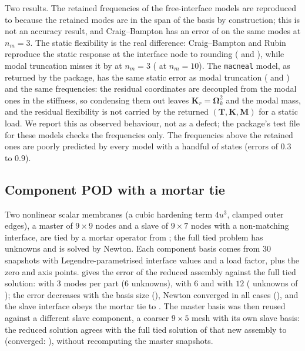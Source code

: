 Two results. The retained frequencies of the free-interface models are reproduced to \ccmFreeRubinLow{} because the retained modes are in the span of the basis by construction; this is not an accuracy result, and Craig--Bampton has an error of \ccmFreeCbLowThree{} on the same modes at $n_m=3$. The static flexibility is the real difference: Craig--Bampton and Rubin reproduce the static response at the interface node to rounding (\ccmFreeCbStatic{} and \ccmFreeRubinStatic{}), while modal truncation misses it by \ccmFreeModalStatic{} at $n_m=3$ (\ccmFreeModalStaticTen{} at $n_m=10$). The \texttt{macneal} model, as returned by the package, has the same static error as modal truncation (\ccmFreeMacStatic{} and \ccmFreeMacStaticTen{}) and the same frequencies: the residual coordinates are decoupled from the modal ones in the stiffness, so condensing them out leaves $\bm K_r=\bm\Omega_k^2$ and the modal mass, and the residual flexibility is not carried by the returned $(\bm T,\bm K,\bm M)$ for a static load. We report this as observed behaviour, not as a defect; the package's test file for these models checks the frequencies only. The frequencies above the retained ones are poorly predicted by every model with a handful of states (errors of $0.3$ to $0.9$).

\subsection{Component POD with a mortar tie}

Two nonlinear scalar membranes (a cubic hardening term $4u^3$, clamped outer edges), a master of $9\times9$ nodes and a slave of $9\times7$ nodes with a non-matching interface, are tied by a mortar operator from ; the full tied problem has \ccmCompFull{} unknowns and is solved by Newton. Each component basis comes from $30$ snapshots with Legendre-parametrised interface values and a load factor, plus the zero and axis points.  gives the error of the reduced assembly against the full tied solution: \ccmCompErrThree{} with $3$ modes per part ($6$ unknowns), \ccmCompErrSix{} with $6$ and \ccmCompErrTwelve{} with $12$ (\ccmCompRedTwelve{} unknowns of \ccmCompFull{}); the error decreases with the basis size (\ccmCompMono), Newton converged in all cases (\ccmCompConv), and the slave interface obeys the mortar tie to \ccmCompTie. The master basis was then reused against a different slave component, a coarser $9\times5$ mesh with its own slave basis: the reduced solution agrees with the full tied solution of that new assembly to \ccmCompReuseErr{} (converged: \ccmCompReuseConv), without recomputing the master snapshots.

